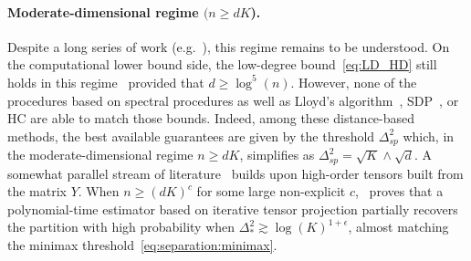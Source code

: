 \documentclass{article}
\begin{document}
\paragraph*{Moderate-dimensional regime $(n \geq dK$).} 
Despite a long series of work (e.g.~\cite{loffler2021optimality, fei2018hidden, LiuLi2022,diakonikolas2018list,Even25}), this regime remains to be understood.  On the computational lower bound side, the low-degree bound~\eqref{eq:LD_HD} still holds in this regime~\cite{Even25} provided that $d\geq \log^{5}(n)$. However, none of the procedures based on  spectral procedures as well as Lloyd's algorithm~\cite{ndaoud2022sharp,LuZhou2016}, SDP~\cite{fei2018hidden,giraud2019partial}, or HC are able to match those bounds. Indeed, among these distance-based methods, the best available guarantees are given by the threshold $\Delta^2_{sp}$
which, in the moderate-dimensional regime $n\geq dK$, simplifies as $\Delta^2_{sp}= \sqrt{K}\land \sqrt{d}$.
A somewhat parallel stream of literature~\cite{hsu2013learning,diakonikolas2018list,hsu2013learning,kothari2018robust} builds upon high-order tensors built from the matrix $Y$. 
When $n\geq (dK)^c$ for some large non-explicit $c$,~\cite{LiuLi2022} proves that a polynomial-time estimator based on iterative tensor projection partially recovers the partition with high probability when $\Delta_*^2 \gtrsim \log(K)^{1+\epsilon}$, almost matching the minimax threshold~\eqref{eq:separation:minimax}.

\end{document}
